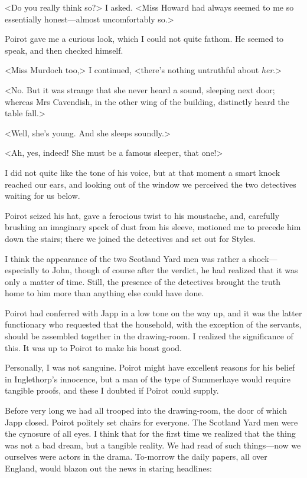  <Do you really think so?> I asked. <Miss Howard had always seemed to me so essentially honest—almost uncomfortably so.> 

 Poirot gave me a curious look, which I could not quite fathom. He seemed to speak, and then checked himself. 

 <Miss Murdoch too,> I continued, <there's nothing untruthful about \emph{her}.> 

 <No. But it was strange that she never heard a sound, sleeping next door; whereas Mrs Cavendish, in the other wing of the building, distinctly heard the table fall.> 

 <Well, she's young. And she sleeps soundly.> 

 <Ah, yes, indeed! She must be a famous sleeper, that one!> 

 I did not quite like the tone of his voice, but at that moment a smart knock reached our ears, and looking out of the window we perceived the two detectives waiting for us below. 

 Poirot seized his hat, gave a ferocious twist to his moustache, and, carefully brushing an imaginary speck of dust from his sleeve, motioned me to precede him down the stairs; there we joined the detectives and set out for Styles. 

 I think the appearance of the two Scotland Yard men was rather a shock—especially to John, though of course after the verdict, he had realized that it was only a matter of time. Still, the presence of the detectives brought the truth home to him more than anything else could have done. 

 Poirot had conferred with Japp in a low tone on the way up, and it was the latter functionary who requested that the household, with the exception of the servants, should be assembled together in the drawing-room. I realized the significance of this. It was up to Poirot to make his boast good. 

 Personally, I was not sanguine. Poirot might have excellent reasons for his belief in Inglethorp's innocence, but a man of the type of Summerhaye would require tangible proofs, and these I doubted if Poirot could supply. 

 Before very long we had all trooped into the drawing-room, the door of which Japp closed. Poirot politely set chairs for everyone. The Scotland Yard men were the cynosure of all eyes. I think that for the first time we realized that the thing was not a bad dream, but a tangible reality. We had read of such things—now we ourselves were actors in the drama. To-morrow the daily papers, all over England, would blazon out the news in staring headlines:  
 
